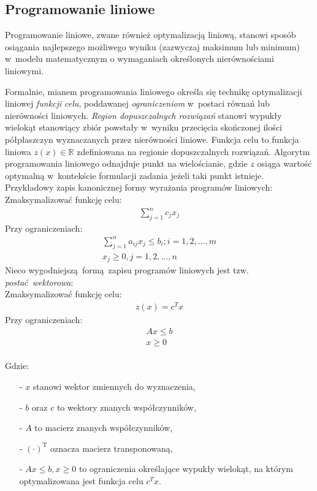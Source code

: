 \subsection{Programowanie liniowe}\label{ss_lp}
\par{
  Programowanie liniowe, zwane również optymalizacją liniową, stanowi sposób
  osiągania najlepszego możliwego wyniku (zazwyczaj maksimum lub minimum) w~modelu 
  matematycznym o wymaganiach określonych nierównościami liniowymi.
}
\par{
  Formalnie, mianem programowania liniowego określa się technikę optymalizacji 
  liniowej \emph{funkcji celu}, poddawanej \emph{ograniczeniom} w~postaci równań 
  lub nierówności liniowych.
  \emph{Region dopuszczalnych rozwiązań} stanowi wypukły wielokąt stanowiący 
  zbiór powstały w~wyniku przecięcia skończonej ilości półpłaszczyn wyznaczanych 
  przez nierówności liniowe.
  Funkcja celu to funkcja liniowa $z(x) \in \mathbb{R}$ zdefiniowana na regionie
  dopuszczalnych rozwiązań.
  Algorytm programowania liniowego odnajduje punkt na wielościanie,
  gdzie $z$ osiąga wartość optymalną w~kontekście formulacji zadania jeżeli taki
  punkt istnieje. 
  Przykładowy zapis kanonicznej formy wyrażania programów liniowych:\\
  Zmaksymalizować funkcję celu:
  \begin{align*}
    \sum_{j=1}^{n} c_j x_j
  \end{align*}
  Przy ograniczeniach: \begin{align*}
    \sum_{j=1}^{n}a_{ij}x_j \leq b_i; i =1, 2, \ldots, m\\
    x_j \geq 0, j=1, 2, \ldots, n
  \end{align*}
  Nieco wygodniejszą~formą zapisu programów liniowych jest tzw.
  \emph{postać~wektorowa}:\\
  Zmaksymalizować funkcję celu:
  \begin{align*}
    z(x)={c^T}x
  \end{align*}
  Przy ograniczeniach: \begin{align*}
    Ax \leq b\\
    x\geq 0
  \end{align*}\\
  Gdzie:
  \begin{itemize}
    \item[-] $x$ stanowi wektor zmiennych do wyznaczenia,
    \item[-] $b$ oraz $c$ to wektory znanych współczynników,
    \item[-] $A$ to macierz znanych współczynników,
    \item[-] ${(\cdot)}^\mathrm{T}$ oznacza macierz transponowaną,
    \item[-] $Ax \leq b, x\geq 0$ to ograniczenia określające wypukły wielokąt,
      na którym optymalizowana jest funkcja celu $c^{T}x$.
  \end{itemize}
}
